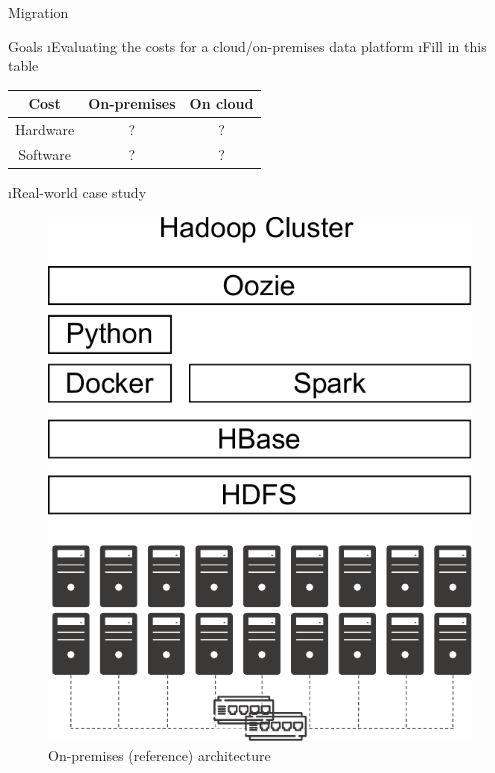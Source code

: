 
\begin{frame}{Migration}

Goals
\i Evaluating the costs for a cloud/on-premises data platform
\i Fill in this table
\begin{table}[h!]
    \centering
    \begin{tabular}{ccc}
        Cost     &  On-premises & On cloud  \\\hline
        Hardware & ?            & ?         \\
        Software & ?            & ?         \\
    \end{tabular}
\end{table}
\i Real-world case study


\framebreak



\begin{figure}
    \centering
    \includegraphics[scale=.5]{imgs/migration.pdf}
    \caption{On-premises (reference) architecture}
\end{figure}


\end{frame}
